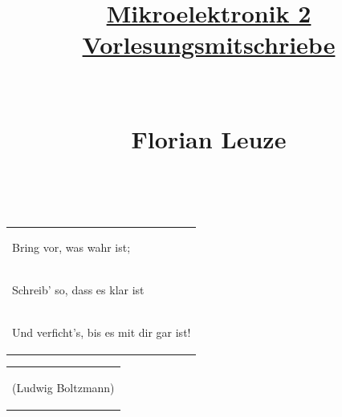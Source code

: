\documentclass[12pt,a4paper]{report}%
\numberwithin{equation}{section}
\numberwithin{equation}{subsection}
\begin{document}


\author{}
\title{\underline{Mikroelektronik 2 Vorlesungsmitschriebe} \\ $\;$ \\ $\;$ \\ Florian Leuze}
\date{}
\maketitle %

$\;$ \newline
$\;$ \newline
$\;$ \newline
$\;$ \newline
$\;$ \newline
$\;$ \newline
$\;$ \newline
$\;$ \newline
$\;$ \newline
$\;$ \newline
$\;$ \newline
$\;$ \newline
\begin{table}[H]
  \centering
  \begin{tabular}{P{14cm}}
    \begin{LARGE}
		  \glqq Bring vor, was wahr ist; 
    \end{LARGE}\\
    \begin{LARGE}
		   Schreib' so, dass es klar ist
    \end{LARGE}\\
    \begin{LARGE}
		   Und verficht's, bis es mit dir gar ist!\grqq
    \end{LARGE}
  \end{tabular}
  \begin{tabular}{l}
    \begin{large}
      (Ludwig Boltzmann)
    \end{large}
  \end{tabular}
\end{table}

\newpage
\tableofcontents
\end{document}

